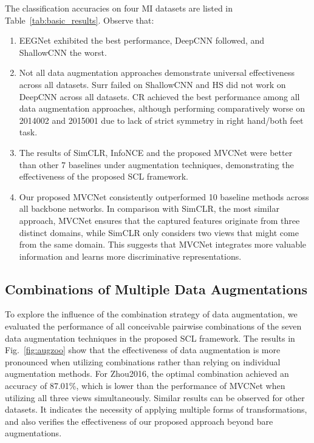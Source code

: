 \documentclass[journal]{IEEEtran}
\begin{document}
The classification accuracies on four MI datasets are listed in Table~\ref{tab:basic_results}. Observe that:
\begin{enumerate}
\item EEGNet exhibited the best performance, DeepCNN followed, and ShallowCNN the worst.
\item Not all data augmentation approaches demonstrate universal effectiveness across all datasets. Surr failed on ShallowCNN and HS did not work on DeepCNN across all datasets. CR achieved the best performance among all data augmentation approaches, although performing comparatively worse on 2014002 and 2015001 due to lack of strict symmetry in right hand/both feet task.
\item The results of SimCLR, InfoNCE and the proposed MVCNet were better than other 7 baselines under augmentation techniques, demonstrating the effectiveness of the proposed SCL framework.
\item Our proposed MVCNet consistently outperformed 10 baseline methods across all backbone networks. In comparison with SimCLR, the most similar approach, MVCNet ensures that the captured features originate from three distinct domains, while SimCLR only considers two views that might come from the same domain. This suggests that MVCNet integrates more valuable information and learns more discriminative representations.
\end{enumerate}

\subsection{Combinations of Multiple Data Augmentations}
To explore the influence of the combination strategy of data augmentation, we evaluated the performance of all conceivable pairwise combinations of the seven data augmentation techniques in the proposed SCL framework. The results in Fig.~\ref{fig:augzoo} show that the effectiveness of data augmentation is more pronounced when utilizing combinations rather than relying on individual augmentation methods. For Zhou2016, the optimal combination achieved an accuracy of 87.01\%, which is lower than the performance of MVCNet when utilizing all three views simultaneously. Similar results can be observed for other datasets. It indicates the necessity of applying multiple forms of transformations, and also verifies the effectiveness of our proposed approach beyond bare augmentations.

\begin{figure*}[htpb]\centering
{}
\caption{Average cross-subject classification accuracies on (a) Zhou2016, (b) Blankertz2007, (c) BNCI2014002, and (d) BNCI2015001 datasets under a single or composition of data augmentations applied. Diagonal entries correspond to a single augmentation, and off-diagonals correspond to the composition of two augmentations.} \label{fig:augzoo}
\end{figure*}
\end{document}
